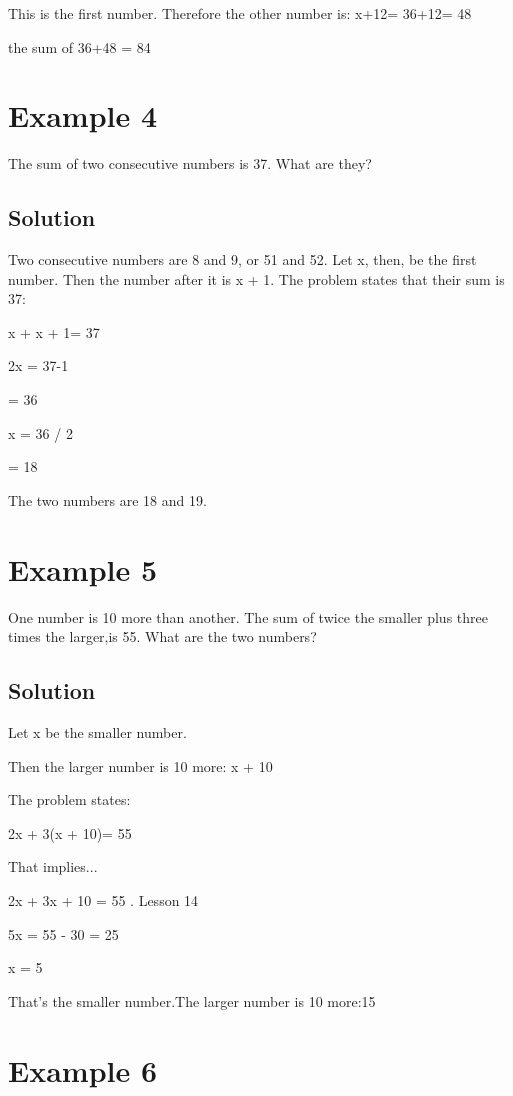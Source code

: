 \documentclass[12pt]{article}%
\begin{document}
          
This is the first number. Therefore the other number is:
     x+12= 36+12= 48
     
     the sum of 36+48 = 84
    
\section{Example 4}     

The sum of two consecutive numbers is 37. What are they?

\subsection{Solution}

Two consecutive numbers are 8 and 9, or 51 and 52. Let x, then, be the first number. Then the number after it is x + 1. The problem states that their sum is 37:  

x + x + 1= 37 

2x = 37-1

= 36 

x = 36 / 2

= 18   

The two numbers are 18 and 19. 

\section{Example 5}

One number is 10 more than another. The sum of twice the smaller plus three times the larger,is 55. What are the two numbers?

\subsection{Solution}

Let x be the smaller number.

Then the larger number is 10 more: x + 10

The problem states: 

2x + 3(x + 10)= 55 

That implies...

2x + 3x + 10 = 55 . Lesson 14 

5x = 55 - 30 = 25 

x = 5 

That's the smaller number.The larger number is 10 more:15 

\section{Example 6} 
\end{document}
